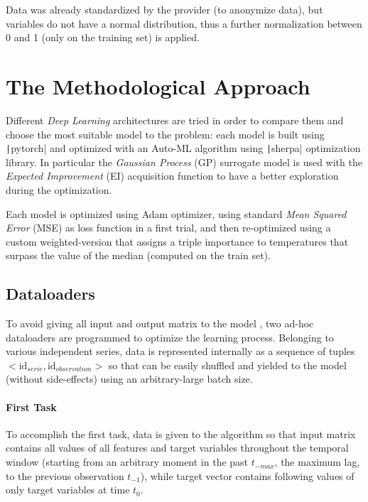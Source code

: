 Data was already standardized by the provider (to anonymize data), but variables do not have a normal distribution, thus a further normalization between 0 and 1 (only on the training set) is applied.\\

\section{The Methodological Approach}
Different \textit{Deep Learning} architectures are tried in order to compare them and choose the most suitable model to the problem: each model is built using \texttt|pytorch| and optimized with an Auto-ML algorithm using \texttt|sherpa| optimization library. In particular the \textit{Gaussian Process} (GP) surrogate model is used with the \textit{Expected Improvement} (EI) acquisition function to have a better exploration during the optimization.

Each model is optimized using Adam optimizer, using standard \textit{Mean Squared Error} (MSE) as loss function in a first trial, and then re-optimized using a custom weighted-version that assigns a triple importance to temperatures that surpass the value of the median (computed on the train set).

\subsection{Dataloaders}
To avoid giving all input and output matrix to the model%
, two ad-hoc dataloaders are programmed to optimize the learning process.
Belonging to various independent series, data is represented internally as a sequence of tuples $<\text{id}_{serie}, \text{id}_{observation}>$ so that can be easily shuffled and yielded to the model (without side-effects) using an arbitrary-large batch size.

\paragraph{First Task}
To accomplish the first task, data is given to the algorithm so that input matrix contains all values of all features and target variables throughout the temporal window (starting from an arbitrary moment in the past $t_{-max}$, the maximum lag, to the previous observation $t_{-1}$), while target vector contains following values of only target variables at time $t_0$.

